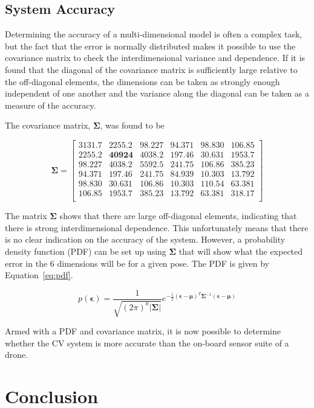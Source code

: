 \subsection{System Accuracy}

Determining the accuracy of a multi-dimensional model is often a complex task, but the fact that the error is normally distributed makes it possible to use the covariance matrix to check the interdimensional variance and dependence. If it is found that the diagonal of the covariance matrix is sufficiently large relative to the off-diagonal elements, the dimensions can be taken as strongly enough independent of one another and the variance along the diagonal can be taken as a measure of the accuracy. 

The covariance matrix, $\bm{\Sigma}$, was found to be 

\[
  \bm{\Sigma} = 
  \begin{bmatrix}
    \bm{3131.7} & 2255.2 & 98.227 & 94.371 &  98.830 & 106.85 \\ 
    2255.2 & \bm{40924}  & 4038.2 & 197.46 &  30.631 & 1953.7 \\
    98.227 & 4038.2 & \bm{5592.5} & 241.75 &  106.86 & 385.23 \\
    94.371 & 197.46 & 241.75 & \bm{84.939} &  10.303 & 13.792 \\
    98.830 & 30.631 & 106.86 & 10.303 &  \bm{110.54} & 63.381 \\
    106.85 & 1953.7 & 385.23 & 13.792 &  63.381 & \bm{318.17} \\
  \end{bmatrix}
\]

The matrix $\bm{\Sigma}$ shows that there are large off-diagonal elements, indicating that there is strong interdimensional dependence. This unfortunately means that there is no clear indication on the accuracy of the system. However, a probability density function (PDF) can be set up using $\bm{\Sigma}$ that will show what the expected error in the 6 dimensions will be for a given pose. The PDF is given by Equation~\ref{eq:pdf}.

\begin{equation}
  \label{eq:pdf}
  p(\bm{\epsilon}) = \frac{1}{\sqrt{{(2\pi)}^k\lvert\bm{\Sigma}\rvert}}e^{-\frac{1}{2}{(\bm{\epsilon} - \bm{\mu})}^T\bm{\Sigma}^{-1}(\bm{\epsilon} - \bm{\mu})}
\end{equation}

Armed with a PDF and covariance matrix, it is now possible to determine whether the CV system is more accurate than the on-board sensor suite of a drone. 

\section{Conclusion}

